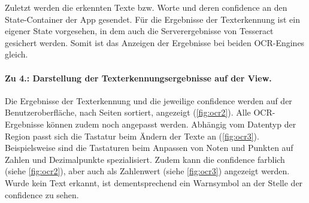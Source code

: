 \documentclass[notables, nomenclature, oneside, 150]{HSMW-Thesis}
\begin{document}
					Zuletzt werden die erkennten Texte bzw. Worte und deren confidence an den State-Container der App gesendet. Für die Ergebnisse der Texterkennung ist ein eigener State vorgesehen, in dem auch die Serverergebnisse von Tesseract gesichert werden. Somit ist das Anzeigen der Ergebnisse bei beiden OCR-Engines gleich.  
				
				\paragraph*{Zu 4.: Darstellung der Texterkennungsergebnisse auf der View.}
					Die Ergebnisse der Texterkennung und die jeweilige confidence werden auf der Benutzeroberfläche, nach Seiten sortiert, angezeigt (\ref{fig:ocr2}). Alle OCR-Ergebnisse können zudem noch angepasst werden. Abhängig vom Datentyp der Region passt sich die Tastatur beim Ändern der Texte an (\ref{fig:ocr3}). Beispielsweise sind die Tastaturen beim Anpassen von Noten und Punkten auf Zahlen und Dezimalpunkte spezialisiert. Zudem kann die confidence farblich (siehe \autoref{fig:ocr2}), aber auch als Zahlenwert (siehe \autoref{fig:ocr3}) angezeigt werden. Wurde kein Text erkannt, ist dementsprechend ein Warnsymbol an der Stelle der confidence zu sehen.  
 
\end{document}
